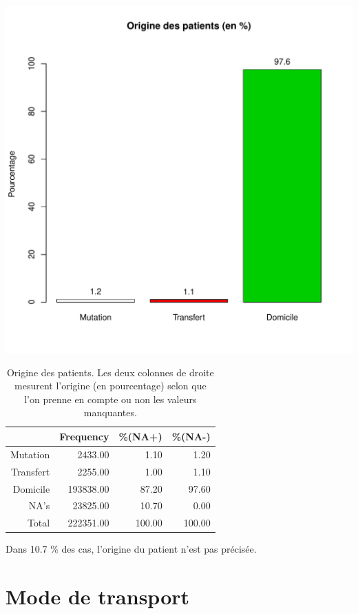 \documentclass[12pt,english,french,twoside]{report}\usepackage[]{graphicx}\usepackage[]{color}
\makeatletter
\def\maxwidth{ %
  \ifdim\Gin@nat@width>\linewidth
    \linewidth
  \else
    \Gin@nat@width
  \fi
}
\makeatother
\begin{document}
\includegraphics[width=\maxwidth]{figure/mode_entree} 
\begin{table}[ht]
\centering
\begin{tabular}{rrrr}
  \hline
 & Frequency &   \%(NA+) &   \%(NA-) \\ 
  \hline
Mutation & 2433.00 & 1.10 & 1.20 \\ 
  Transfert & 2255.00 & 1.00 & 1.10 \\ 
  Domicile & 193838.00 & 87.20 & 97.60 \\ 
  NA's & 23825.00 & 10.70 & 0.00 \\ 
    Total & 222351.00 & 100.00 & 100.00 \\ 
   \hline
\end{tabular}
\caption[Origine des patients]{Origine des patients. Les deux colonnes de droite mesurent l'origine (en pourcentage) selon que l'on prenne en compte ou non les valeurs manquantes. } 
\label{origine}
\end{table}



Dans 10.7 \% des cas, l'origine du patient n'est pas précisée.

\section*{Mode de transport}
\end{document}

